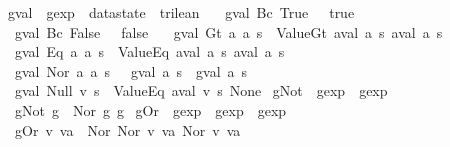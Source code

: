 \begin{isabellebody}
\isanewline
{}\isamarkupfalse%
\ gval\ {\isacharcolon}{\isacharcolon}\ {\isachardoublequoteopen}gexp\ {\isasymRightarrow}\ datastate\ {\isasymRightarrow}\ trilean{\isachardoublequoteclose}\ \isanewline
\ \ {\isachardoublequoteopen}gval\ {\isacharparenleft}Bc\ True{\isacharparenright}\ {\isacharunderscore}\ {\isacharequal}\ true{\isachardoublequoteclose}\ {\isacharbar}\isanewline
\ \ {\isachardoublequoteopen}gval\ {\isacharparenleft}Bc\ False{\isacharparenright}\ {\isacharunderscore}\ {\isacharequal}\ false{\isachardoublequoteclose}\ {\isacharbar}\isanewline
\ \ {\isachardoublequoteopen}gval\ {\isacharparenleft}Gt\ a\ a\ s\ {\isacharequal}\ ValueGt\ {\isacharparenleft}aval\ a\ s{\isacharparenright}\ {\isacharparenleft}aval\ a\ s{\isacharparenright}{\isachardoublequoteclose}\ {\isacharbar}\isanewline
\ \ {\isachardoublequoteopen}gval\ {\isacharparenleft}Eq\ a\ a\ s\ {\isacharequal}\ ValueEq\ {\isacharparenleft}aval\ a\ s{\isacharparenright}\ {\isacharparenleft}aval\ a\ s{\isacharparenright}{\isachardoublequoteclose}\ {\isacharbar}\isanewline
\ \ {\isachardoublequoteopen}gval\ {\isacharparenleft}Nor\ a\ a\ s\ {\isacharequal}\ {\isasymnot}\isactrlsub {\isacharquery}\ {\isacharparenleft}{\isacharparenleft}gval\ a\ s{\isacharparenright}\ {\isasymor}\isactrlsub {\isacharquery}\ {\isacharparenleft}gval\ a\ s{\isacharparenright}{\isacharparenright}{\isachardoublequoteclose}\ {\isacharbar}\isanewline
\ \ {\isachardoublequoteopen}gval\ {\isacharparenleft}Null\ v{\isacharparenright}\ s\ {\isacharequal}\ ValueEq\ {\isacharparenleft}aval\ v\ s{\isacharparenright}\ None{\isachardoublequoteclose}\isanewline
\isanewline
{}\isamarkupfalse%
\ gNot\ {\isacharcolon}{\isacharcolon}\ {\isachardoublequoteopen}gexp\ {\isasymRightarrow}\ gexp{\isachardoublequoteclose}\ \ \isanewline
\ \ {\isachardoublequoteopen}gNot\ g\ {\isasymequiv}\ Nor\ g\ g{\isachardoublequoteclose}\isanewline
\isanewline
{}\isamarkupfalse%
\ gOr\ {\isacharcolon}{\isacharcolon}\ {\isachardoublequoteopen}gexp\ {\isasymRightarrow}\ gexp\ {\isasymRightarrow}\ gexp{\isachardoublequoteclose}\ \ \isanewline
\ \ {\isachardoublequoteopen}gOr\ v\ va\ {\isasymequiv}\ Nor\ {\isacharparenleft}Nor\ v\ va{\isacharparenright}\ {\isacharparenleft}Nor\ v\ va{\isacharparenright}{\isachardoublequoteclose}\isanewline

\end{isabellebody}
